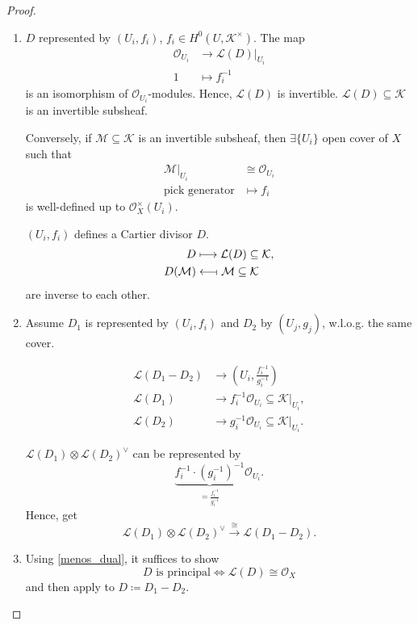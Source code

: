 \documentclass[12pt]{article}
\theoremstyle{definition}
\theoremstyle{remark}
\begin{document}
\begin{proof}
\begin{enumerate}[label=\roman*)]
\item $D$ represented by $(U_i,f_i)$, $f_i\in H^0(U,\mathcal{K}^{\times})$. The map
\begin{align*}
\mathcal{O}_{U_i}&\longrightarrow\mathcal{L}(D)|_{U_i}\\
1&\longmapsto f_i^{-1}
\end{align*}
is an isomorphism of $\mathcal{O}_{U_i}$-modules. Hence, $\mathcal{L}(D)$ is invertible. $\mathcal{L}(D)\subseteq\mathcal{K}$ is an invertible subsheaf.

Conversely, if $\mathcal{M}\subseteq\mathcal{K}$ is an invertible subsheaf, then $\exists\{U_i\}$ open cover of $X$ such that
\begin{align*}
\mathcal{M}|_{U_i}&\cong\mathcal{O}_{U_i}\\
\text{pick generator}&\mapsto f_i
\end{align*}
is well-defined up to $\mathcal{O}_X^{\times}(U_i)$.

$(U_i,f_i)$ defines a Cartier divisor $D$.
\begin{align*}
D&\longmapsto\mathcal{L}(D)\subseteq\mathcal{K},\\
D(\mathcal{M})&\longleftarrow\!\shortmid\mathcal{M}\subseteq\mathcal{K}
\end{align*}
are inverse to each other.

\item Assume $D_1$ is represented by $(U_i,f_i)$ and $D_2$ by $(U_j,g_j)$, w.l.o.g. the same cover.

\begin{align*}
\mathcal{L}(D_1-D_2)&\longrightarrow\left(U_i,\frac{f_i^{-1}}{g_i^{-1}}\right)\\
\mathcal{L}(D_1)&\longrightarrow f_i^{-1}\mathcal{O}_{U_i}\subseteq\mathcal{K}|_{U_i},\\
\mathcal{L}(D_2)&\longrightarrow g_i^{-1}\mathcal{O}_{U_i}\subseteq\mathcal{K}|_{U_i}.
\end{align*}

$\mathcal{L}(D_1)\otimes\mathcal{L}(D_2)^{\vee}$ can be represented by
\[\underbrace{f_i^{-1}\cdot(g_i^{-1})^{-1}}_{=\frac{f_i^{-1}}{g_i^{-1}}}\mathcal{O}_{U_i}.\]
Hence, get
\[\mathcal{L}(D_1)\otimes\mathcal{L}(D_2)^{\vee}\overset{\cong}{\longrightarrow}\mathcal{L}(D_1-D_2).\]

\item Using \ref{menos_dual}, it suffices to show
\[D\text{ is principal}\Longleftrightarrow\mathcal{L}(D)\cong\mathcal{O}_X\]
and then apply to $D\coloneqq D_1-D_2$.


\end{enumerate}
\end{proof}
\end{document}
